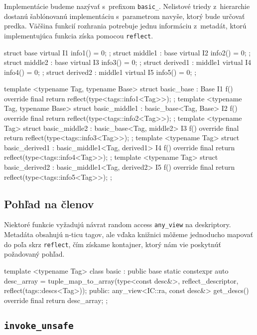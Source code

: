 Implementácie budeme nazývať s~prefixom \texttt{basic\_}. Nelistové triedy z~hierarchie dostanú šablónovanú implementáciu s~parametrom navyše, ktorý bude určovať predka. Väčšina funkcií rozhrania potrebuje jednu informáciu z~metadát, ktorú implementujúca funkcia získa pomocou \texttt{reflect}.
\begin{code}[fontsize=\footnotesize]
struct base               { virtual I1 info1() = 0; };
struct middle1 : base     { virtual I2 info2() = 0; };
struct middle2 : base     { virtual I3 info3() = 0; };
struct derived1 : middle1 { virtual I4 info4() = 0; };
struct derived2 : middle1 { virtual I5 info5() = 0; };

template <typename Tag, typename Base>
struct basic_base : Base
{ I1 f() override final { return reflect(type<tags::info1<Tag>>); } };
template <typename Tag, typename Base>
struct basic_middle1 : basic_base<Tag, Base>
{ I2 f() override final { return reflect(type<tags::info2<Tag>>); } };
template <typename Tag>
struct basic_middle2 : basic_base<Tag, middle2>
{ I3 f() override final { return reflect(type<tags::info3<Tag>>); } };
template <typename Tag>
struct basic_derived1 : basic_middle1<Tag, derived1>
{ I4 f() override final { return reflect(type<tags::info4<Tag>>); } };
template <typename Tag>
struct basic_derived2 : basic_middle1<Tag, derived2>
{ I5 f() override final { return reflect(type<tags::info5<Tag>>); } };
\end{code}

\subsection*{Pohľad na členov}

Niektoré funkcie vyžadujú návrat random access \texttt{any\_view} na deskriptory. Metadáta obsahujú n-ticu tagov, ale vďaka knižnici \PP{} môžeme jednoducho mapovať do poľa skrz \texttt{reflect}, čím získame kontajner, ktorý nám vie poskytnúť požadovaný pohľad.
\begin{code}
template <typename Tag> class basic : public base
{   static constexpr auto desc_array =
        tuple_map_to_array(type<const desc&>,
                           reflect_descriptor,
                           reflect(tags::descs<Tag>));
public:
    any_view<IC::ra, const desc&> get_descs() override final
    { return desc_array; }
};
\end{code}

\subsection*{\texttt{invoke\_unsafe}}


